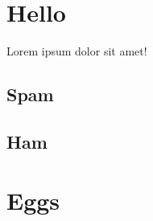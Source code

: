 \documentclass{cricalm}
\begin{document}
\section{Hello}
Lorem ipsum dolor sit amet!

\lipsum


\subsection{Spam}
\lipsum

\subsection{Ham}
\lipsum[8-9]

\section{Eggs}
\lipsum[10-22]
\end{document}
